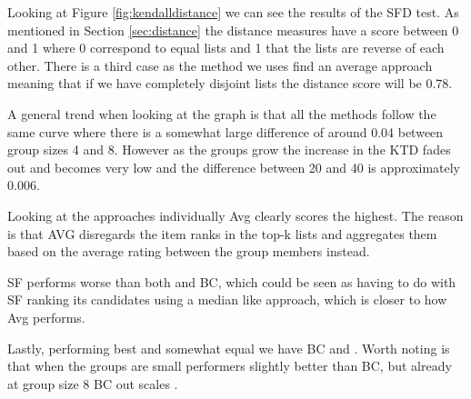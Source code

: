 Looking at Figure \ref{fig:kendalldistance} we can see the results of the SFD test. As mentioned in Section \ref{sec:distance} the distance measures have a score between 0 and 1 where 0 correspond to equal lists and 1 that the lists are reverse of each other. There is a third case as the method we uses find an average approach meaning that if we have completely disjoint lists the distance score will be 0.78.

A general trend when looking at the graph is that all the methods follow the same curve where there is a somewhat large difference of around 0.04 between group sizes 4 and 8. However as the groups grow the increase in the KTD fades out and becomes very low and the difference between 20 and 40 is approximately 0.006. 

Looking at the approaches individually Avg clearly scores the highest. The reason is that AVG disregards the item ranks in the top-k lists and aggregates them based on the average rating between the group members instead.

SF performs worse than both \MC and BC, which could be seen as having to do with SF ranking its candidates using a median like approach, which is closer to how Avg performs.
   

Lastly, performing best and somewhat equal we have BC and \MC. Worth noting is that when the groups are small \MC performers slightly better than BC, but already at group size 8 BC out scales \MC.

